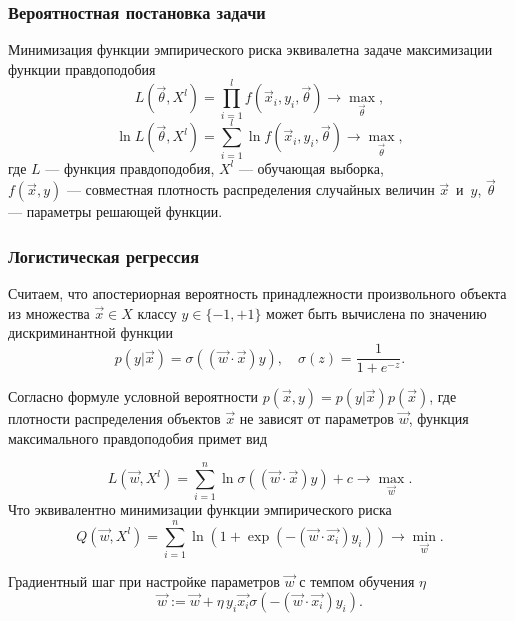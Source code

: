 \documentclass[compress,professionalfont]{beamer}
\begin{document}
\begin{frame}
\frametitle{Вероятностная постановка задачи}

Минимизация функции эмпирического риска эквивалетна задаче максимизации функции правдоподобия
$$
L(\vec{\theta}, X^l) = \prod\limits_{i=1}^l f(\vec{x}_i, y_i, \vec{\theta}) \rightarrow \max_{\vec{\theta}},
$$
$$
\ln L(\vec{\theta}, X^l) = \sum_{i=1}^{l} \ln f(\vec{x}_i, y_i, \vec{\theta}) \rightarrow \max_{\vec{\theta}},
$$
где $L$ --- функция правдоподобия, $X^l$ --- обучающая выборка, \\
$f(\vec{x}, y)$ --- совместная плотность распределения случайных величин $\vec{x}$~и~$y$,
$\vec{\theta}$ --- параметры решающей функции.

\end{frame}

\begin{frame}
\frametitle{Логистическая регрессия}
\small

Считаем, что апостериорная вероятность принадлежности произвольного объекта из множества $\vec{x} \in X$ классу $y \in \{-1, +1\}$ может быть вычислена по значению дискриминантной функции
$$
p(y|\vec{x}) = \sigma ((\vec{w} \cdot \vec{x}) y), \quad \sigma(z) = \dfrac{1}{1+ e^{-z}}.
$$

Согласно формуле условной вероятности $p(\vec{x},y) = p(y|\vec{x})p(\vec{x})$, где плотности распределения объектов $\vec{x}$ не зависят от параметров $\vec{w}$, функция максимального правдоподобия примет вид

$$
L\left(\vec{w}, X^l\right) =  \sum_{i=1}^{n} \ln \sigma((\vec{w} \cdot \vec{x})y) + c \rightarrow \max_{\vec{w}}.
$$
Что эквивалентно минимизации функции эмпирического риска
$$
Q\left(\vec{w}, X^l\right) = \sum_{i=1}^{n} \ln{\left(1 + \exp{(-(\vec{w} \cdot \vec{x_i})y_i)}\right)} \rightarrow \min_{\vec{w}}.
$$

Градиентный шаг при настройке параметров $\vec{w}$ с темпом обучения $\eta$
$$
\vec{w} := \vec{w} + \eta\,y_i \vec{x_i} \sigma(-(\vec{w} \cdot \vec{x_i})y_i).
$$

\end{frame}
\end{document}
